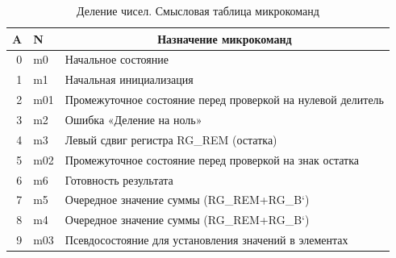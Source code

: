 \documentclass[a4paper,14pt]{extarticle}
\begin{document}
\begin{table}[h!]
		\small
		\centering
	\begin{tabular}{|r||l|l|}
		
		\hline
		\multicolumn{1}{|l||}{\textbf{A}} & \textbf{N} & \multicolumn{1}{c|}{\textbf{Назначение микрокоманд}} \\ \hline\hline
		0 & m0 & Начальное состояние \\ \hline
		1 & m1 & Начальная инициализация \\ \hline
		2 & m01 & Промежуточное состояние перед проверкой на нулевой делитель \\ \hline
		3 & m2 & Ошибка «Деление на ноль» \\ \hline
		4 & m3 & Левый сдвиг регистра RG\_REM (остатка) \\ \hline
		5 & m02 & Промежуточное состояние перед проверкой на знак остатка \\ \hline
		6 & m6 & Готовность результата \\ \hline
		7 & m5 & Очередное значение суммы (RG\_REM+RG\_B`) \\ \hline
		8 & m4 & Очередное значение суммы (RG\_REM+RG\_B`) \\ \hline
		9 & m03 & Псевдосостояние для установления значений в элементах \\ \hline
	\end{tabular}
	\caption{Деление чисел. Смысловая таблица микрокоманд}
	\label{tab:coursedivmeaning}
\end{table}
\fi
\end{document}
